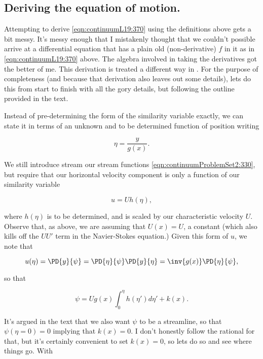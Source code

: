 \subsection{Deriving the equation of motion.}

Attempting to derive \ref{eqn:continuumL19:370} using the definitions above gets a bit messy.  It's messy enough that I mistakenly thought that we couldn't possible arrive at a differential equation that has a plain old (non-derivative) $f$ in it as in \ref{eqn:continuumL19:370} above.  The algebra involved in taking the derivatives got the better of me.  This derivation is treated a different way in \cite{acheson1990elementary}.  For the purpose of completeness (and because that derivation also leaves out some details), lets do this from start to finish with all the gory details, but following the outline provided in the text.

Instead of pre-determining the form of the similarity variable exactly, we can state it in terms of an unknown and to be determined function of position writing

\begin{equation}\label{eqn:continuumL19:770}
\eta = \frac{y}{g(x)}.
\end{equation}

We still introduce stream our stream functions \ref{eqn:continuumProblemSet2:330}, but require that our horizontal velocity component is only a function of our similarity variable

\begin{equation}\label{eqn:continuumL19:790}
u = U h(\eta),
\end{equation}

where $h(\eta)$ is to be determined, and is scaled by our characteristic velocity $U$.  Observe that, as above, we are assuming that $U(x) = U$, a constant (which also kills off the $U U'$ term in the Navier-Stokes equation.)  Given this form of $u$, we note that 

\begin{equation}\label{eqn:continuumL19:810}
u(\eta) = \PD{y}{\psi} = \PD{\eta}{\psi} \PD{y}{\eta} = \inv{g(x)} \PD{\eta}{\psi},
\end{equation}

so that

\begin{equation}\label{eqn:continuumL19:830}
\psi = U g(x) \int_0^\eta h(\eta') d\eta' + k(x).
\end{equation}

It's argued in the text that we also want $\psi$ to be a streamline, so that $\psi(\eta = 0) = 0$ implying that $k(x) = 0$.  I don't honestly follow the rational for that, but it's certainly convenient to set $k(x) = 0$, so lets do so and see where things go.  With

